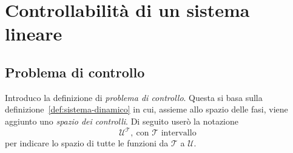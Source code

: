 \section{Controllabilità di un sistema lineare}

\subsection{Problema di controllo}
Introduco la definizione di \emph{problema di controllo}.
Questa si basa sulla definizione~\ref{def:sistema-dinamico} in cui,
assieme allo spazio delle fasi, viene aggiunto uno \emph{spazio dei controlli}.
Di seguito userò la notazione
\begin{equation*}
    \mathcal U^{\mathcal T},\ \text{con } \mathcal T \text{ intervallo}
\end{equation*}
per indicare lo spazio di tutte le funzioni da $\mathcal T$ a $\mathcal U$.

